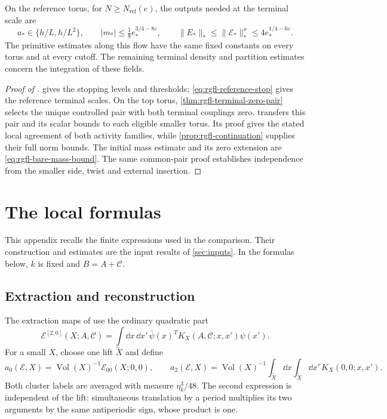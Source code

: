 On the reference torus, for $N\ge N_{\mathrm{ref}}(e)$,
the outputs needed at the terminal scale are
\begin{equation}\label{eq:rgfl-reference-terminal-input}
 a_*\in\{h/L,h/L^2\},\qquad
 |m_*|\le\tfrac18e_*^{3/4-8\varepsilon},\qquad
 \|E_*\|_*\le\|\mathscr E_*\|_*^x
                                 \le4e_*^{1/4-6\varepsilon}.
\end{equation}
The primitive estimates along this flow have the
same fixed constants on every torus and at every
cutoff. The remaining terminal density and partition
estimates concern the integration of these fields.



\begin{proof}[Proof of ]
 gives the stopping levels and thresholds;
\eqref{eq:rgfl-reference-stop} gives the reference terminal scales.
On the top torus, \cref{thm:rgfl-terminal-zero-pair} selects the unique
controlled pair with both terminal couplings zero.
 transfers this pair and its scalar bounds
to each eligible smaller torus. Its proof gives the stated local
agreement of both activity families, while
\cref{prop:rgfl-continuation} supplies their full norm bounds.
The initial mass estimate and its zero extension are
\eqref{eq:rgfl-bare-mass-bound}. The same common-pair proof establishes
independence from the smaller side, twist and external insertion.
\end{proof}
\appendix
\section{The local formulas}\label{app:formulas}
This appendix recalls the finite expressions used in the comparison.
Their construction and estimates are the input results of
\cref{sec:inputs}. In the formulas below, $k$ is fixed and
$B=A+\mathscr C$.

\subsection{Extraction and reconstruction}
The extraction maps of \cite[\S3.1]{NormalizedContraction} use the
ordinary quadratic part
\[
 \mathscr E^{[2,0]}(X;A,\mathscr C)=\int\dd x\,\dd x'\,
 \bar\psi(x)^T K_X(A,\mathscr C;x,x')\psi(x').
\]
For a small $X$, choose one lift $\widetilde X$ and define
\begin{equation}\label{eq:rg-local-extractions}
 a_0(\mathscr E,X)
       =\operatorname{Vol}(X)^{-1}\mathscr E_{00}(X;0,0),\qquad
 a_2(\mathscr E,X)
       =\operatorname{Vol}(X)^{-1}
             \int_{\widetilde X}\dd x\int_{\widetilde X}\dd x'\,
                                                    K_X(0,0;x,x').
\end{equation}
Both cluster labels are averaged with measure $\eta_k^3/48$.
The second expression is independent of the lift: simultaneous
translation by a period multiplies its two arguments by the
same antiperiodic sign, whose product is one.

